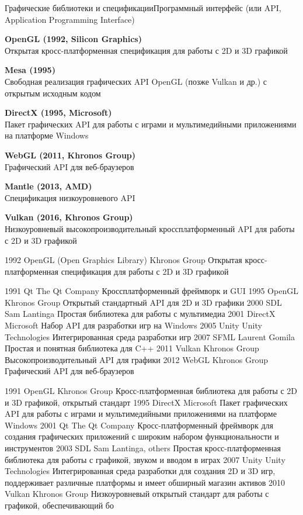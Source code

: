 \documentclass{beamer}
\begin{document}
\begin{frame}{Графические библиотеки и спецификации}{Программный интерфейс (или API, Application Programming Interface)}
	{\small
	\textbf{OpenGL (1992, Silicon Graphics)} \\
	Открытая кросс-платформенная спецификация для работы с 2D и 3D графикой
	
	\textbf{Mesa (1995)} \\
	Свободная реализация графических API OpenGL (позже Vulkan и др.) с открытым исходным кодом
	
	\textbf{DirectX (1995, Microsoft)} \\
	Пакет графических API для работы с играми и мультимедийными приложениями на платформе Windows
	
	\textbf{WebGL (2011,	Khronos Group)} \\
	Графический API для веб-браузеров 
	
	\textbf{Mantle (2013, AMD)} \\
	Спецификация низкоуровневого API
	
	\textbf{Vulkan (2016, Khronos Group)} \\
	Низкоуровневый высокопроизводительный кроссплатформенный API для работы с 2D и 3D графикой
	}
	
	1992 OpenGL (Open Graphics Library) 	Khronos Group 
	Открытая кросс-платформенная спецификация для работы с 2D и 3D графикой
	
	1991	Qt	The Qt Company	Кроссплатформенный фреймворк и GUI
	1995	OpenGL	Khronos Group	Открытый стандартный API для 2D и 3D графики
	2000	SDL	Sam Lantinga	Простая библиотека для работы с мультимедиа
	2001	DirectX	Microsoft	Набор API для разработки игр на Windows
	2005	Unity	Unity Technologies	Интегрированная среда разработки игр
	2007	SFML	Laurent Gomila	Простая и понятная библиотека для C++
	2011	Vulkan	Khronos Group	Высокопроизводительный API для графики
	2012	WebGL	Khronos Group	Графический API для веб-браузеров
	
	
	1991	OpenGL	Khronos Group	Кросс-платформенная библиотека для работы с 2D и 3D графикой, открытый стандарт
	1995	DirectX	Microsoft	Пакет графических API для работы с играми и мультимедийными приложениями на платформе Windows
	2001	Qt	The Qt Company	Кросс-платформенный фреймворк для создания графических приложений с широким набором функциональности и инструментов
	2003	SDL	Sam Lantinga, others	Простая кросс-платформенная библиотека для работы с графикой, звуком и вводом в играх
	2007	Unity	Unity Technologies	Интегрированная среда разработки для создания 2D и 3D игр, поддерживает различные платформы и имеет обширный магазин активов
	2010	Vulkan	Khronos Group	Низкоуровневый открытый стандарт для работы с графикой, обеспечивающий бо
	
	\fi
	
	
\end{frame}
\end{document}
